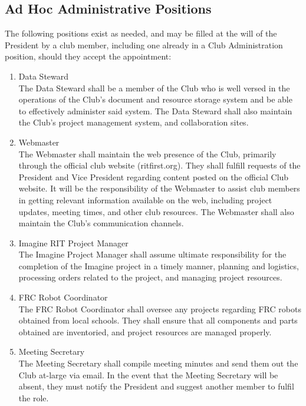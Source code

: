 \documentclass[english,11pt]{article}
\begin{document}
\subsection{Ad Hoc Administrative Positions} \label{sect:cadmin:adhoc}
The following positions exist as needed, and may be filled at the will of the President by a club member, including one already in a Club Administration position, should they accept the appointment:

\begin{enumerate}[label=\Alph*.]
    \item {\large Data Steward} \\
            The Data Steward shall be a member of the Club who is well versed in the operations of the Club's document and resource storage system and be able to effectively administer said system.
            The Data Steward shall also maintain the Club's project management system, and collaboration sites.
    \item {\large Webmaster} \\
            The Webmaster shall maintain the web presence of the Club, primarily through the official club website (ritfirst.org).
            They shall fulfill requests of the President and Vice President regarding content posted on the official Club website.
            It will be the responsibility of the Webmaster to assist club members in getting relevant information available on the web, including project updates, meeting times, and other club resources.
            The Webmaster shall also maintain the Club's communication channels.
    \item {\large Imagine RIT Project Manager} \\
            The Imagine Project Manager shall assume ultimate responsibility for the completion of the Imagine project in a timely manner, planning and logistics, processing orders related to the project, and managing project resources.
    \item {\large FRC Robot Coordinator} \\
            The FRC Robot Coordinator shall oversee any projects regarding FRC robots obtained from local schools.
            They shall ensure that all components and parts obtained are inventoried, and project resources are managed properly.
    \item {\large Meeting Secretary} \\
            The Meeting Secretary shall compile meeting minutes and send them out the Club at-large via email.
            In the event that the Meeting Secretary will be absent, they must notify the President and suggest another member to fulfil the role.
\end{enumerate}
\end{document}
